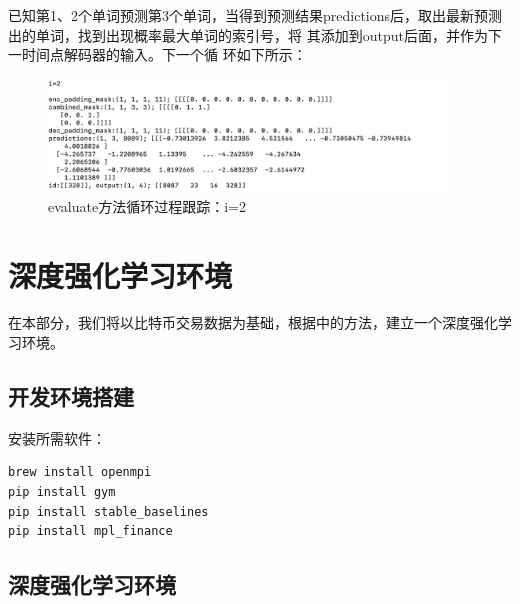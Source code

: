 \documentclass{article}
\begin{document}
已知第1、2个单词预测第3个单词，当得到预测结果predictions后，取出最新预测出的单词，找到出现概率最大单词的索引号，将
其添加到output后面，并作为下一时间点解码器的输入。下一个循
环如下所示：
\begin{figure}[H]
    \caption{evaluate方法循环过程跟踪：i=2}
    \label{f000090}
    \centering
    \includegraphics[height=3cm]{images/f000090}
\end{figure}


    
    











\section{深度强化学习环境}
在本部分，我们将以比特币交易数据为基础，根据\cite{r000007}中的方法，建立一个深度强化学习环境。
\subsection{开发环境搭建}
安装所需软件：
\lstset{language=BASH}
\begin{lstlisting}
brew install openmpi
pip install gym
pip install stable_baselines
pip install mpl_finance
\end{lstlisting}
\subsection{深度强化学习环境}
\end{document}
